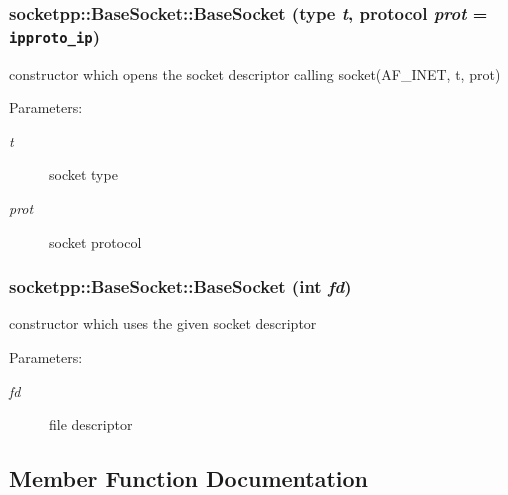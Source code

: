 \begin{CompactItemize}
{\subsubsection[{BaseSocket}]{\setlength{\rightskip}{0pt plus 5cm}socketpp::BaseSocket::BaseSocket (type {\em t}, \/  protocol {\em prot} = {\tt ipproto\_\-ip})}}
\label{classsocketpp_1_1BaseSocket_35c982d7aef2041c100439cf38aa7f4d}


constructor which opens the socket descriptor calling socket(AF\_\-INET, t, prot) 

\begin{Desc}
\item[Parameters:]
\begin{description}
\item[{\em t}]socket type \item[{\em prot}]socket protocol \end{description}
\end{Desc}
\hypertarget{classsocketpp_1_1BaseSocket_f7e18d6700868abb2b476e797506eafb}{
\subsubsection[{BaseSocket}]{\setlength{\rightskip}{0pt plus 5cm}socketpp::BaseSocket::BaseSocket (int {\em fd})}}
\label{classsocketpp_1_1BaseSocket_f7e18d6700868abb2b476e797506eafb}


constructor which uses the given socket descriptor 

\begin{Desc}
\item[Parameters:]
\begin{description}
\item[{\em fd}]file descriptor \end{description}
\end{Desc}


\subsection{Member Function Documentation}
\hypertarget{classsocketpp_1_1BaseSocket_1b1249c5843a5d9205a6599670addf87}{
}
\end{CompactItemize}
